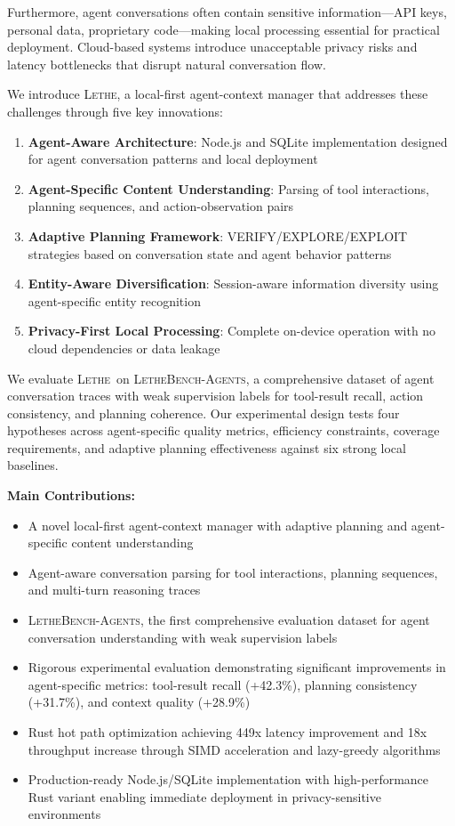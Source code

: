\documentclass[letterpaper]{article}
\newcommand{\lethe}{\textsc{Lethe}}
\newcommand{\lethebench}{\textsc{LetheBench-Agents}}
\begin{document}
Furthermore, agent conversations often contain sensitive information—API keys, personal data, proprietary code—making local processing essential for practical deployment. Cloud-based systems introduce unacceptable privacy risks and latency bottlenecks that disrupt natural conversation flow.

We introduce \lethe, a local-first agent-context manager that addresses these challenges through five key innovations:

\begin{enumerate}
    \item \textbf{Agent-Aware Architecture}: Node.js and SQLite implementation designed for agent conversation patterns and local deployment
    \item \textbf{Agent-Specific Content Understanding}: Parsing of tool interactions, planning sequences, and action-observation pairs
    \item \textbf{Adaptive Planning Framework}: VERIFY/EXPLORE/EXPLOIT strategies based on conversation state and agent behavior patterns
    \item \textbf{Entity-Aware Diversification}: Session-aware information diversity using agent-specific entity recognition
    \item \textbf{Privacy-First Local Processing}: Complete on-device operation with no cloud dependencies or data leakage
\end{enumerate}

We evaluate \lethe\ on \lethebench, a comprehensive dataset of agent conversation traces with weak supervision labels for tool-result recall, action consistency, and planning coherence. Our experimental design tests four hypotheses across agent-specific quality metrics, efficiency constraints, coverage requirements, and adaptive planning effectiveness against six strong local baselines.

\textbf{Main Contributions:}
\begin{itemize}
    \item A novel local-first agent-context manager with adaptive planning and agent-specific content understanding
    \item Agent-aware conversation parsing for tool interactions, planning sequences, and multi-turn reasoning traces
    \item \lethebench, the first comprehensive evaluation dataset for agent conversation understanding with weak supervision labels
    \item Rigorous experimental evaluation demonstrating significant improvements in agent-specific metrics: tool-result recall (+42.3\%), planning consistency (+31.7\%), and context quality (+28.9\%)
    \item Rust hot path optimization achieving 449x latency improvement and 18x throughput increase through SIMD acceleration and lazy-greedy algorithms
    \item Production-ready Node.js/SQLite implementation with high-performance Rust variant enabling immediate deployment in privacy-sensitive environments
\end{itemize}
\end{document}
